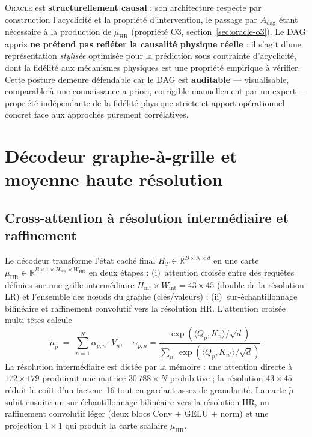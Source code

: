 \documentclass[14pt,a4paper,openany]{extreport}
\theoremstyle{definition}
\newcommand{\Oracle}{\textsc{Oracle}}
\newcommand{\HR}{\ensuremath{\text{HR}}}
\newcommand{\muHR}{\ensuremath{\mu_{\HR}}}
\newcommand{\Adag}{\ensuremath{A_{\mathrm{dag}}}}
\newcommand{\HT}{\ensuremath{H_T}}
\begin{document}
\begin{disclaimerbox}
\Oracle{} est \textbf{structurellement causal} : son architecture respecte par construction l'acyclicité et la propriété d'intervention, le passage par $\Adag$ étant nécessaire à la production de $\muHR$ (propriété O3, section~\ref{sec:oracle-o3}). Le DAG appris \textbf{ne prétend pas refléter la causalité physique réelle} : il s'agit d'une représentation \emph{stylisée} optimisée pour la prédiction sous contrainte d'acyclicité, dont la fidélité aux mécanismes physiques est une propriété empirique à vérifier. Cette posture demeure défendable car le DAG est \textbf{auditable} — visualisable, comparable à une connaissance a priori, corrigible manuellement par un expert — propriété indépendante de la fidélité physique stricte et apport opérationnel concret face aux approches purement corrélatives.
\end{disclaimerbox}

\section{Décodeur graphe-à-grille et moyenne haute résolution}
\label{sec:oracle-decoder}

\subsection{Cross-attention à résolution intermédiaire et raffinement}
\label{ssec:oracle-decoder-principe}

Le décodeur transforme l'état caché final $\HT \in \mathbb{R}^{B \times N \times d}$ en une carte $\muHR \in \mathbb{R}^{B \times 1 \times H_{\HR} \times W_{\HR}}$ en deux étapes : (i)~attention croisée entre des requêtes définies sur une grille intermédiaire $H_{\mathrm{int}} \times W_{\mathrm{int}} = 43 \times 45$ (double de la résolution LR) et l'ensemble des nœuds du graphe (clés/valeurs) ; (ii)~sur-échantillonnage bilinéaire et raffinement convolutif vers la résolution HR. L'attention croisée multi-têtes calcule
\begin{equation}
  \tilde{\mu}_p \;=\; \sum_{n=1}^{N} \alpha_{p,n} \cdot V_n,
  \quad
  \alpha_{p,n} = \frac{\exp\!\left( \langle Q_p, K_n \rangle / \sqrt{d} \right)}{\sum_{n'} \exp\!\left( \langle Q_p, K_{n'} \rangle / \sqrt{d} \right)}.
  \label{eq:cross-attention}
\end{equation}
La résolution intermédiaire est dictée par la mémoire : une attention directe à $172 \times 179$ produirait une matrice $30\,788 \times N$ prohibitive ; la résolution $43 \times 45$ réduit le coût d'un facteur~16 tout en gardant assez de granularité. La carte $\tilde{\mu}$ subit ensuite un sur-échantillonnage bilinéaire vers la résolution HR, un raffinement convolutif léger (deux blocs Conv + GELU + norm) et une projection $1 \times 1$ qui produit la carte scalaire $\muHR$.
\end{document}
